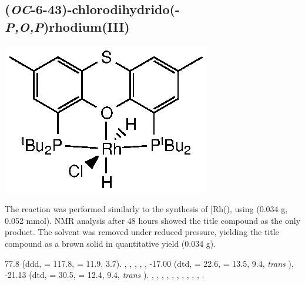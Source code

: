 
\subsection*{(\emph{OC}-6-43)-chlorodihydrido(\tButhixantphosk-\emph{P,O,P})rhodium(III)}

\begin{structure}[h]
\begin{center}
\includegraphics{../Structures/StBuRhClH2.eps}
\end{center}
\end{structure}

The reaction was performed similarly to the synthesis of [Rh(\tBusixantphos)\ce{Cl(H)2]}, using \tButhixantphos{} (0.034 g, 0.052 mmol).  NMR analysis after 48 hours showed the title compound as the only product.  The solvent was removed under reduced pressure, yielding the title compound as a brown solid in quantitative yield (0.034 g).  

77.8 (ddd, \JRhP{} = 117.8, \JPH{} = 11.9, 3.7).
,
,
,
,
,
-17.00 (dtd, \JRhH{} = 22.6, \JPH{} = 13.5, \JHH{} 9.4,  \emph{trans} ),
-21.13 (dtd, \JRhH{} = 30.5, \JPH{} = 12.4, \JHH{} 9.4,  \emph{trans} ).
,
,
,
,
,
,
,
,
,
,
.



